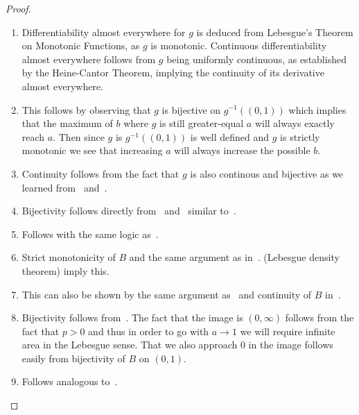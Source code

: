 \begin{proof}
\begin{enumerate}
        \item\label{item:differentiability} Differentiability almost everywhere for \(g\) is deduced from Lebesgue's Theorem on Monotonic Functions, as \(g\) is monotonic. Continuous differentiability almost everywhere follows from \(g\) being uniformly continuous, as established by the Heine-Cantor Theorem, implying the continuity of its derivative almost everywhere.

        \item\label{item:monotonicity2} This follows by observing that $g$ is bijective on $g^{-1}((0,1))$ which implies that the maximum of $b$ where $g$ is still greater-equal $a$ will always exactly reach $a$. Then since $g$ is $g^{-1}((0,1))$ is well defined and $g$ is strictly monotonic we see that increasing $a$ will always increase the possible $b$.

        \item\label{item:continuity2} Continuity follows from the fact that $g$ is also continous and bijective as we learned from~ and~.

        \item Bijectivity follows directly from~ and~ similar to~.

        \item Follows with the same logic as~.

              \item\label{item:monotonicity3} Strict monotonicity of $B$ and the same argument as in~. (Lebesgue density theorem) imply this.

        \item This can also be shown by the same argument as~ and continuity of $B$ in~.

        \item Bijectivity follows from~. The fact that the image is $(0,\infty)$ follows from the fact that $p>0$ and thus in order to go with $a \to 1$ we will require infinite area in the Lebesgue sense. That we also approach $0$ in the image follows easily from bijectivity of $B$ on $(0,1)$.

        \item Follows analogous to~.

    \end{enumerate}
\end{proof}


